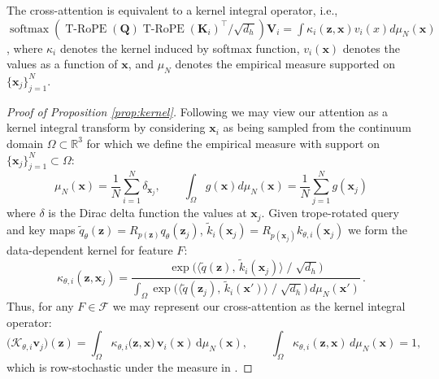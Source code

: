 \begin{proposition}
\label{prop:kernel}
The cross-attention is equivalent to a kernel integral operator, i.e., $\operatorname{softmax}(\operatorname{T-RoPE}(\mathbf Q) \operatorname{T-RoPE}(\mathbf K_i)^\top/\sqrt{d_h}) \mathbf V_i = \int \kappa_i(\mathbf{z}, \mathbf{x}) v_i(x) d \mu_N(\mathbf{x})$, where $\kappa_i$ denotes the kernel induced by softmax function, $v_i(\mathbf x)$ denotes the values as a function of $\mathbf x$, and $\mu_N$ denotes the empirical measure supported on $\{ \mathbf{x}_j\}_{j=1}^N$. 
\end{proposition}



\label{appx:kernel_integral_cross_att}
\begin{proof}[Proof of Proposition \ref{prop:kernel}]
Following \cite{gao_learning_2024} we may view our attention as a kernel integral transform by considering \(\mathbf{x}_i\) as being sampled from the continuum domain \(\Omega \subset \mathbb{R}^3\) for which we define the empirical measure with support on \(\{\mathbf{x}_j\}_{j=1}^N \subset \Omega\):
\begin{equation}
    {\mu_N} (\mathbf{x}) = \frac{1}{N} \sum_{i=1}^N \delta_{\mathbf{x}_j}, \qquad \int_\Omega g(\mathbf{x})d {\mu_N } (\mathbf x) =\frac{1}{N} \sum_{j=1}^N g(\mathbf{x}_j)
    \label{eq:measure}
\end{equation}
where \(\delta\) is the Dirac delta function  the values at \(\mathbf{x}_j\).
Given \gls{trope}-rotated query and key maps \(\tilde{q}_\theta(\mathbf{z})=R_{p(\mathbf{z})}q_\theta(\mathbf{z}_j)\), \(\tilde{k}_i(\mathbf{x}_j)=R_{p(\mathbf{x}_j)}k_{\theta,i}(\mathbf{x}_j)\) we form the data-dependent kernel for feature \(F\):
\begin{equation}
    \kappa_{\theta,i}(\mathbf{z}, \mathbf{x}_j)
    = 
    \frac{
      \exp\bigl(\langle \tilde q(\mathbf{z}),\,\tilde k_i(\mathbf{x}_j)\rangle \;/\;\sqrt{d_{h}}\bigr)
    }{
      \displaystyle
      \int_{\Omega}
        \exp\bigl(\langle \tilde q(\mathbf{z}_{j}),\,\tilde k_i(\mathbf{x}')\rangle \;/\;\sqrt{d_{h}}\bigr)
        \,d\mu_{N}(\mathbf{x}')
    }\,.
\end{equation}
Thus, for any \(F \in \mathcal{F}\) we may represent our cross-attention as the kernel integral operator:
\begin{equation}
    \bigl(\mathcal{K}_{\theta,i} \mathbf{v}_j\bigr)(\mathbf{z}) = \int_{\Omega} \kappa_{\theta,i}\bigl(\mathbf{z}, \mathbf{x}\bigr)\,\mathbf{v}_i(\mathbf{x})\,\mathrm{d}\mu_N(\mathbf{x}),
    \qquad
    \int_\Omega\kappa_{\theta,i}(\mathbf{z},\mathbf{x})\, d \mu_N(\mathbf{x})=1,
\end{equation}
which is row-stochastic under the measure in .     
\end{proof}


